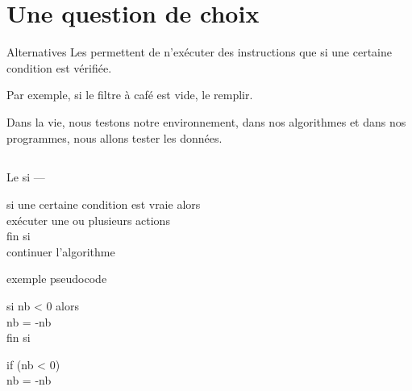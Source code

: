 \section{Une question de choix}
\frame{\sectionpage}

\begin{frame}{Alternatives}
  Les  permettent de n’exécuter des
  instructions que si une certaine \alert{condition} est vérifiée.

  Par exemple, si le filtre à café est vide, le remplir.
  
  Dans la vie, nous testons notre environnement, dans nos algorithmes et
  dans nos programmes, nous allons tester les données.
  
\end{frame}

\subsection{}
\begin{frame}[fragile]{Le si --- }
  \begin{langagenaturel}
    si une certaine condition est vraie alors\\
    \tab exécuter une ou plusieurs actions\\
    fin si\\
    continuer l'algorithme
  \end{langagenaturel}

\end{frame}

\begin{frame}[fragile]{exemple pseudocode}

  \begin{langagenaturel}
    si nb < 0 alors\\
      \tab nb = -nb\\
    fin si
  \end{langagenaturel}


  \begin{langagenaturel}
    if (nb < 0)\\
      \tab nb = -nb\\
  \end{langagenaturel}
\end{frame}

